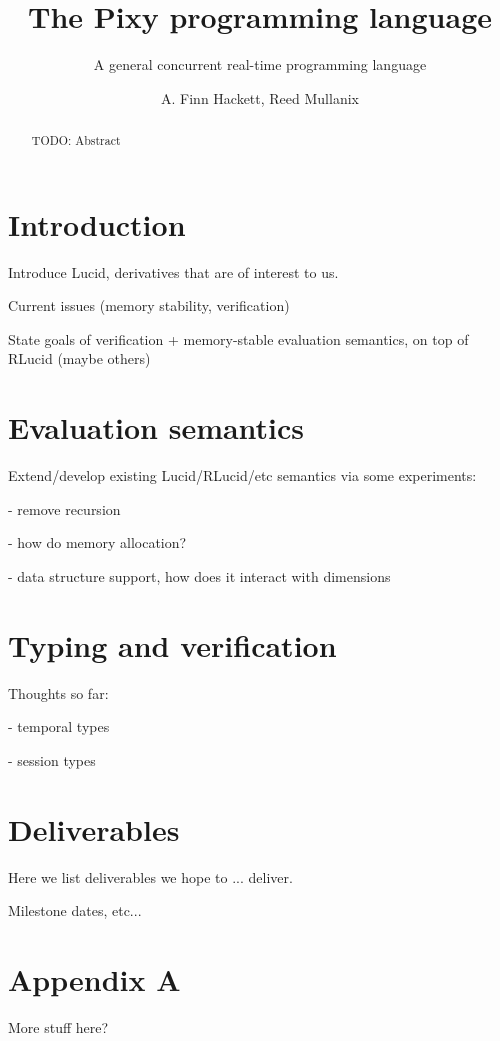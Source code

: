 \documentclass{scrartcl}
\begin{document}
    \title{The Pixy programming language}
    \subtitle{A general concurrent real-time programming language}
    \author{A. Finn Hackett, Reed Mullanix}
    
    \maketitle
    
    \begin{abstract}
        TODO: Abstract
    \end{abstract}

    \tableofcontents

    \section{Introduction}
    
    Introduce Lucid, derivatives that are of interest to us.
    
    Current issues (memory stability, verification)
    
    State goals of verification + memory-stable evaluation semantics, on top of RLucid (maybe others)
    
    \section{Evaluation semantics}
    
    Extend/develop existing Lucid/RLucid/etc semantics via some experiments:
    
    - remove recursion
    
    - how do memory allocation?
    
    - data structure support, how does it interact with dimensions
    
    \section{Typing and verification}
    
    Thoughts so far:
    
    - temporal types
    
    - session types
    
    \section{Deliverables}
    
    Here we list deliverables we hope to ... deliver.
    
    Milestone dates, etc...
    
    \appendix
    
    \section{Appendix A}
    
    More stuff here?
\end{document}
